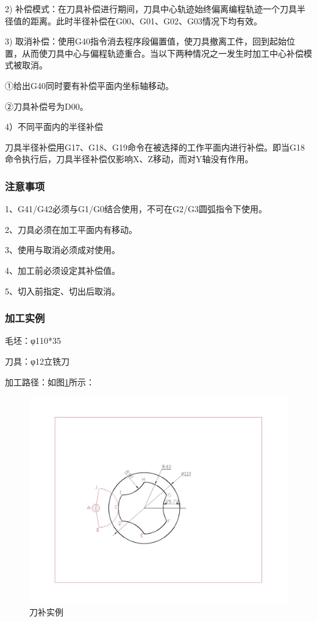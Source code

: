2) 补偿模式：在刀具补偿进行期间，刀具中心轨迹始终偏离编程轨迹一个刀具半径值的距离。此时半径补偿在G00、G01、G02、G03情况下均有效。 

3) 取消补偿：使用G40指令消去程序段偏置值，使刀具撤离工件，回到起始位置，从而使刀具中心与偏程轨迹重合。当以下两种情况之一发生时加工中心补偿模式被取消。

①给出G40同时要有补偿平面内坐标轴移动。

②刀具补偿号为D00。

4）不同平面内的半径补偿 

刀具半径补偿用G17、G18、G19命令在被选择的工作平面内进行补偿。即当G18命令执行后，刀具半径补偿仅影响X、Z移动，而对Y轴没有作用。


\subsubsection{注意事项}
1、G41/G42必须与G1/G0结合使用，不可在G2/G3圆弧指令下使用。

2、刀具必须在加工平面内有移动。

3、使用与取消必须成对使用。

4、加工前必须设定其补偿值。

5、切入前指定、切出后取消。

\subsubsection{加工实例}
毛坯：φ110*35

刀具：φ12立铣刀

加工路径：如图\ref{fig:8-2}所示：

\begin{figure}[h]
	\centering
	\includegraphics[width=0.8\linewidth,trim=280 250 430 280,clip]{data/image/8-2.jpg}
	\caption{刀补实例}
	\label{fig:8-2}
\end{figure}

